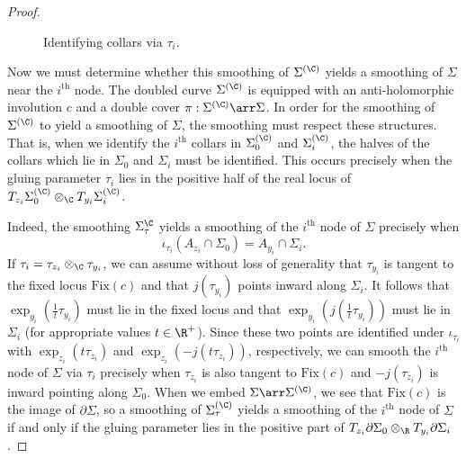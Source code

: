 \begin{lemma}
\begin{proof}
\begin{figure}[ht]
\caption{Identifying collars via $\tau_i$.}
\label{iota}
\end{figure}

Now we must determine whether this smoothing of $\Sigma^{(\C)}$ yields a smoothing of $\Sigma$ near the $i^{\text{th}}$ node. The doubled curve $\Sigma^{(\C)}$ is equipped with an anti-holomorphic involution $c$ and a double cover $\pi:\Sigma^{(\C)}\arr\Sigma$. In order for the smoothing of $\Sigma^{(\C)}$ to yield a smoothing of $\Sigma$, the smoothing must respect these structures. That is, when we identify the $i^{\text{th}}$ collars in $\Sigma_0^{(\C)}$ and $\Sigma_i^{(\C)}$, the halves of the collars which lie in $\Sigma_0$ and $\Sigma_i$ must be identified. This occurs precisely when the gluing parameter $\tau_i$ lies in the positive half of the real locus of $T_{z_i}\Sigma_0^{(\C)} \otimes_\C T_{y_i}\Sigma_i^{(\C)}$.

Indeed, the smoothing $\Sigma_\tau^{\C}$ yields a smoothing of the $i^{\text{th}}$ node of $\Sigma$ precisely when
\[
\iota_{\tau_i}(A_{z_i} \cap \Sigma_0)=A_{y_i} \cap \Sigma_i.
\]
If $\tau_i=\tau_{z_i} \otimes_\C \tau_{y_i}$, we can assume without loss of generality that $\tau_{y_i}$ is tangent to the fixed locus $\text{Fix}(c)$ and that $j(\tau_{y_i})$ points inward along $\Sigma_i$. It follows that $\exp_{y_i}(\tfrac{1}{t}\tau_{y_i})$ must lie in the fixed locus and that $\exp_{y_i}(j(\tfrac{1}{t}\tau_{y_i}))$ must lie in $\Sigma_i$ (for appropriate values $t \in \R^+$). Since these two points are identified under $\iota_{\tau_i}$ with $\exp_{z_i}(t\tau_{z_i})$ and $\exp_{z_i}(-j(t\tau_{z_i}))$, respectively, we can smooth the $i^{\text{th}}$ node of $\Sigma$ via $\tau_i$ precisely when $\tau_{z_i}$ is also tangent to $\text{Fix}(c)$ and $-j(\tau_{z_i})$ is inward pointing along $\Sigma_0$. When we embed $\Sigma \arr \Sigma^{(\C)}$, we see that $\text{Fix}(c)$ is the image of $\partial\Sigma$, so a smoothing of $\Sigma_\tau^{(\C)}$ yields a smoothing of the $i^{\text{th}}$ node of $\Sigma$ if and only if the gluing parameter lies in the positive part of $T_{z_i}\partial\Sigma_0 \otimes_\R T_{y_i}\partial\Sigma_i$.


\end{proof}
\end{lemma}
